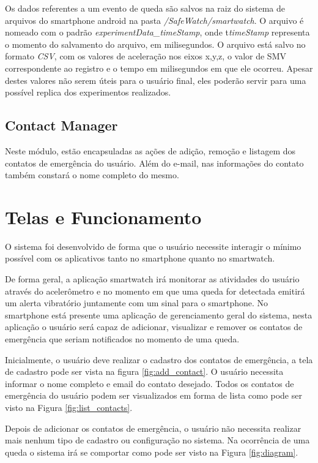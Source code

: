 Os dados referentes a um evento de queda são salvos na raiz do sistema de arquivos do smartphone android na pasta \textit{/SafeWatch/smartwatch}. O arquivo é nomeado com o padrão \textit{experimentData\_timeStamp}, onde t\textit{timeStamp} representa o momento do salvamento do arquivo, em milisegundos. O arquivo está salvo no formato \textit{CSV}, com os valores de aceleração nos eixos x,y,z, o valor de \ac{SMV} correspondente ao registro e o tempo em milisegundos em que ele ocorreu. Apesar destes valores não serem úteis para o usuário final, eles poderão servir para uma possível replica dos experimentos realizados. 

\subsection{Contact Manager}
Neste módulo, estão encapsuladas as ações de adição, remoção e listagem dos contatos de emergência do usuário. Além do e-mail, nas informações do contato também constará o nome completo do mesmo. 


\section{Telas e Funcionamento}
\label{sec:screens}
O sistema foi desenvolvido de forma que o usuário necessite interagir o mínimo possível com os aplicativos tanto no smartphone quanto no smartwatch. 

De forma geral, a aplicação smartwatch irá monitorar as atividades do usuário através do acelerômetro e no momento em que uma queda for detectada emitirá um alerta vibratório juntamente com um sinal para o smartphone. No smartphone está presente uma aplicação de gerenciamento geral do sistema, nesta aplicação o usuário será capaz de adicionar, visualizar e remover os contatos de emergência que seriam notificados no momento de uma queda.

Inicialmente, o usuário deve realizar o cadastro dos contatos de emergência, a tela de cadastro pode ser vista na figura \ref{fig:add_contact}. O usuário necessita informar o nome completo e email do contato desejado. Todos os contatos de emergência do usuário podem ser visualizados em forma de lista como pode ser visto na Figura \ref{fig:list_contacts}.


Depois de adicionar os contatos de emergência, o usuário não necessita realizar mais nenhum tipo de cadastro ou configuração no sistema. Na ocorrência de uma queda o sistema irá se comportar como pode ser visto na Figura \ref{fig:diagram}.


